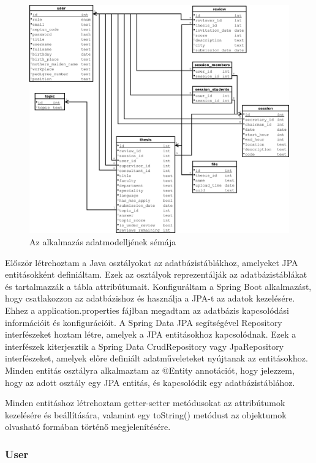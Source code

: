 \begin{figure}[ht]
	\includegraphics[width=\textwidth]{images/Adatmodell.pdf}
	\caption{Az alkalmazás adatmodelljének sémája}
	\label{fig:datamodel}
\end{figure}


Először létrehoztam a Java osztályokat az adatbázistáblákhoz, amelyeket JPA entitásokként definiáltam. Ezek az osztályok reprezentálják az adatbázistáblákat és tartalmazzák a tábla attribútumait. Konfiguráltam a Spring Boot alkalmazást, hogy csatlakozzon az adatbázishoz és használja a JPA-t az adatok kezelésére. Ehhez a application.properties fájlban megadtam az adatbázis kapcsolódási információit és konfigurációit. A Spring Data JPA segítségével Repository interfészeket hoztam létre, amelyek a JPA entitásokhoz kapcsolódnak. Ezek a interfészek kiterjesztik a Spring Data CrudRepository vagy JpaRepository interfészeket, amelyek előre definiált adatműveleteket nyújtanak az entitásokhoz. Minden entitás osztályra alkalmaztam az @Entity annotációt, hogy jelezzem, hogy az adott osztály egy JPA entitás, és kapcsolódik egy adatbázistáblához.


Minden entitáshoz létrehoztam getter-setter metódusokat az attribútumok kezelésére és beállítására, valamint egy toString() metódust az objektumok olvasható formában történő megjelenítésére.

\subsubsection{User}

